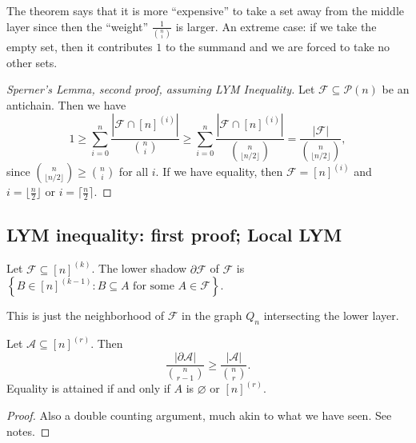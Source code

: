 The theorem says that it is more ``expensive'' to take a set away from the middle layer since then the ``weight'' $\frac{1}{\binom{n}{i}}$ is larger. An extreme case: if we take the empty set, then it contributes $1$ to the summand and we are forced to take no other sets.



\begin{proof}[Sperner's Lemma, second proof, assuming LYM Inequality]
  Let $\mathcal{F} \subseteq \mathcal{P}(n)$ be an antichain. Then we have $$
  1 \ge \sum_{i = 0}^{n} \frac{|\mathcal{F} \cap [n]^{(i)}|}{\binom{n}{i}}  \ge \sum_{i = 0}^{n} \frac{|\mathcal{F} \cap [n]^{(i)}|}{\binom{n}{\lfloor n / 2 \rfloor}} = \frac{|\mathcal{F}|}{\binom{n}{\lfloor n / 2 \rfloor}}
  ,$$ 
  since $\binom{n}{\lfloor n / 2 \rfloor} \ge \binom{n}{i}$  for all $i$. 
  If we have equality, then $\mathcal{F} = [n]^{(i)}$ and $i = \lfloor \frac{n}{2} \rfloor$ or   $i = \lceil   \frac{n}{2} \rceil$.
\end{proof}



\subsection{LYM inequality: first proof; Local LYM}

Let $\mathcal{F} \subseteq [n]^{(k)}$. The lower shadow $\partial \mathcal{F}$ of $\mathcal{F}$ is $\left\{ B \in [n]^{(k-1)} : B \subseteq A \text{ for some } A \in \mathcal{F} \right\} $.


This is just the neighborhood of $\mathcal{F}$ in the graph $Q_n$ intersecting the lower layer. 


\begin{lemma}
  Let $\mathcal{A} \subseteq [n]^{(r)}$. Then $$
  \frac{| \partial \mathcal{A} |}{\binom{n}{r-1}} \ge \frac{| \mathcal{A} |}{\binom{n}{r}}
  .$$
  Equality is attained if and only if $A$ is $\varnothing$ or $[n]^{(r)}$.  
\end{lemma}

\begin{proof}
  Also a double counting argument, much akin to what we have seen. See notes.
\end{proof}


